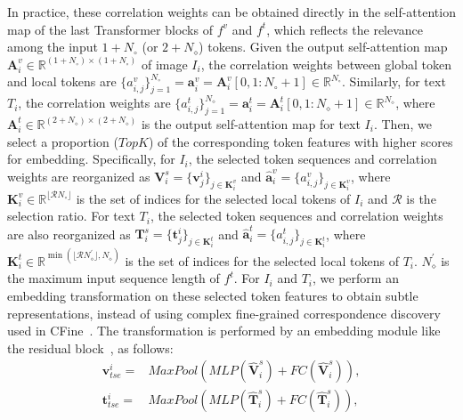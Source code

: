 \documentclass[10pt,twocolumn,letterpaper]{article}
\begin{document}
In practice, these correlation weights can be obtained directly in the self-attention map of the last Transformer blocks of $f^v$ and $f^t$, which reflects the relevance among the input $1+N_\circ$ (or $2+N_\diamond$) tokens. Given the output self-attention map $\boldsymbol{A}^v_i\in\mathbb{R}^{(1+N_\circ)\times(1+N_\circ)}$ of image $I_i$, the correlation weights between global token and local tokens are $\{a^v_{i,j}\}^{N_\circ}_{j=1}=\boldsymbol{a}^v_i=\boldsymbol{A}^v_i[0,1:N_\circ+1 ]\in\mathbb{R}^{N_\circ}$.
Similarly, for text $T_i$, the correlation weights are $\{a^t_{i,j}\}^{N_\diamond}_{j=1}=\boldsymbol{a}^t_i=\boldsymbol{A}^t_i[0,1:N_\diamond+1]\in\mathbb{R}^{N_\diamond}$, where $\boldsymbol{A}^t_i\in\mathbb{R}^{(2+N_\diamond)\times(2+N_\diamond)}$ is the output self-attention map for text $I_i$. 
Then, we select a proportion ($TopK$) of the corresponding token features with higher scores for embedding. Specifically, for $I_i$, the selected token sequences and correlation weights are reorganized as $\boldsymbol{V}^s_i=\{ \boldsymbol{v}^i_j \}_{j\in\boldsymbol{K}^v_i }$
and $\hat{\boldsymbol{a}}^v_i=\{ a^v_{i,j}\}_{j\in\boldsymbol{K}^v_i }$, where $\boldsymbol{K}^v_i\in \mathbb{R}^{\lfloor \mathcal{R} N_\circ \rfloor}$ is the set of indices for the selected local tokens of $I_i$ and $\mathcal{R}$ is the selection ratio. For text $T_i$, the selected token sequences and correlation weights are also reorganized as $\boldsymbol{T}^s_i=\{ \boldsymbol{t}^i_j \}_{j\in\boldsymbol{K}^t_i }$
and $\hat{\boldsymbol{a}}^t_i=\{ a^t_{i,j}\}_{j\in\boldsymbol{K}^t_i }$, where
$\boldsymbol{K}^t_i\in \mathbb{R}^{\min(\lfloor \mathcal{R} N_\diamond^\prime \rfloor, N_\diamond)}$ is the set of indices for the selected local tokens of $T_i$. $N_\diamond^\prime$ is the maximum input sequence length of $f^t$.
For $I_i$ and $T_i$, we perform an embedding transformation on these selected token features to obtain subtle representations, instead of using complex fine-grained correspondence discovery used in CFine~\cite{yan2022clip}. The transformation is performed by an embedding module like the residual block~\cite{he2016deep}, as follows:
\begin{equation}
    \begin{aligned}
        \boldsymbol{v}^i_{tse} =&{MaxPool}({MLP(\hat{\boldsymbol{V}}^s_i)}+FC(\hat{\boldsymbol{V}}^s_i)),\\
        \boldsymbol{t}^i_{tse} =&{MaxPool}({MLP(\hat{\boldsymbol{T}}^s_i)}+FC(\hat{\boldsymbol{T}}^s_i)), 
    \end{aligned}
\end{equation}
\end{document}
